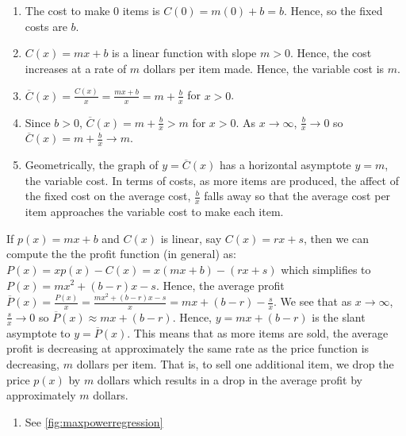 \begin{exenum}
\begin{enumerate}
\item  The cost to make $0$ items is $C(0) = m(0)+b = b$.  Hence,  so the fixed costs are $b$.
\item $C(x) = mx+b$ is a linear function with slope $m>0$.  Hence, the cost increases at a rate of $m$ dollars per item made.  Hence, the variable cost is $m$.
\item  $\overline{C}(x) = \frac{C(x)}{x} = \frac{mx+b}{x} = m + \frac{b}{x}$ for $x > 0$.
\item  Since $b>0$,  $\overline{C}(x)  = m + \frac{b}{x} > m$ for $x > 0$. As $x \rightarrow \infty$, $\frac{b}{x} \rightarrow 0$ so $\overline{C}(x)  = m + \frac{b}{x} \rightarrow m$.
\item Geometrically, the graph of $y = \overline{C}(x)$ has a horizontal asymptote $y = m$, the variable cost.  In terms of costs, as more items are produced, the affect of the fixed cost on the average cost, $\frac{b}{x}$ falls away so that the average cost per item approaches the variable cost to make each item.

\end{enumerate}

\item   If $p(x) = mx + b$ and $C(x)$ is linear, say $C(x) = rx+s$, then we can compute the the profit function (in general) as: $P(x) = xp(x) - C(x) = x(mx+b) - (rx+s)$ which simplifies to $P(x) = mx^2 + (b-r)x -s$.  Hence, the average profit $\overline{P}(x) = \frac{P(x)}{x} = \frac{mx^2 + (b-r)x -s}{x} = mx + (b-r) - \frac{s}{x}$.  We see that as $x \rightarrow \infty$, $\frac{s}{x} \rightarrow 0$ so $\overline{P}(x) \approx mx  + (b-r)$.  Hence, $y = mx + (b-r)$ is the slant asymptote  to $y = \overline{P}(x)$.  This means that as more items are sold, the average profit is decreasing at approximately the same rate as the price function is decreasing, $m$ dollars per item.  That is, to sell one additional item, we drop the price $p(x)$ by $m$ dollars which results in a drop in the average profit by approximately $m$ dollars.

\item \begin{enumerate}

\item See \autoref{fig:maxpowerregression}

\begin{mfigure}

\caption{}
\label{fig:maxpowerregression}
\end{mfigure}


\end{enumerate}
\end{exenum}

